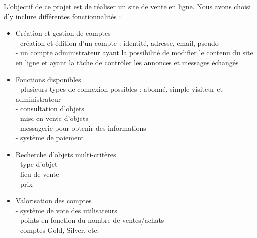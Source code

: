 L’objectif de ce projet est de réaliser un site de vente en ligne. Nous avons choisi d'y inclure différentes fonctionnalités : \\
\begin{itemize}
	\item Création et gestion de comptes \\
- création et édition d’un compte : identité, adresse, email, pseudo \\
- un compte administrateur ayant la possibilité de modifier le contenu du site en ligne et ayant la tâche de contrôler les annonces et messages échangés 

	\item  Fonctions disponibles \\
- plusieurs types de connexion possibles : abonné, simple visiteur et administrateur \\
- consultation d’objets \\
- mise en vente d’objets \\
- messagerie pour obtenir des informations \\
- système de paiement 

	\item Recherche d’objets multi-critères \\
- type d’objet \\
- lieu de vente \\
- prix 

	\item Valorisation des comptes \\
- système de vote des utilisateurs \\
- points en fonction du nombre de ventes/achats \\
- comptes Gold, Silver, etc. \\
\end{itemize}